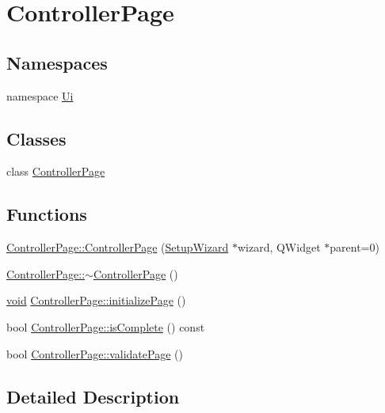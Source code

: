 \hypertarget{group___controller_page}{\section{Controller\-Page}
\label{group___controller_page}
}
\subsection*{Namespaces}
\begin{DoxyCompactItemize}
\item 
namespace \hyperlink{namespace_ui}{Ui}
\end{DoxyCompactItemize}
\subsection*{Classes}
\begin{DoxyCompactItemize}
\item 
class \hyperlink{class_controller_page}{Controller\-Page}
\end{DoxyCompactItemize}
\subsection*{Functions}
\begin{DoxyCompactItemize}
\item 
\hyperlink{group___controller_page_ga82de0473ed3c57a5a89736525b0336f2}{Controller\-Page\-::\-Controller\-Page} (\hyperlink{class_setup_wizard}{Setup\-Wizard} $\ast$wizard, Q\-Widget $\ast$parent=0)
\item 
\hyperlink{group___controller_page_ga5573a5d2568f7e15528658e32de887d3}{Controller\-Page\-::$\sim$\-Controller\-Page} ()
\item 
\hyperlink{group___u_a_v_objects_plugin_ga444cf2ff3f0ecbe028adce838d373f5c}{void} \hyperlink{group___controller_page_gaf9c2ad04637cf0961bd7bb5d5d5200c4}{Controller\-Page\-::initialize\-Page} ()
\item 
bool \hyperlink{group___controller_page_gae5ede361df9cdf86bf53ce39ef72267c}{Controller\-Page\-::is\-Complete} () const 
\item 
bool \hyperlink{group___controller_page_ga91bcb88db666a8d5585553520d1247b9}{Controller\-Page\-::validate\-Page} ()
\end{DoxyCompactItemize}


\subsection{Detailed Description}


